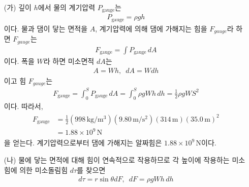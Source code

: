 \documentclass[floatfix,nofootinbib,superscriptaddress,fleqn]{revtex4-2}
\begin{document}
\begin{itemize}
  \item[(가)]
  깊이 $h$에서 물의 계기압력 $P_{\mathrm{gauge}}$는
  \begin{align}
    P_{\mathrm{gauge}} = \rho g h
  \end{align}
  이다.
  물과 댐이 닿는 면적을 $A$, 계기압력에 의해 댐에 가해지는 힘을 
  $F_{gauge}$라 하면 $F_{gauge}$는
  \begin{align}
    F_{\mathrm{gauge}} = \int P_{\mathrm{gauge}}\,dA
  \end{align}
  이다. 폭을 $W$라 하면 미소면적 $dA$는
  \begin{align}
    A = Wh,\,\,\, dA = Wdh
  \end{align}
  이고 힘 $F_{gauge}$는
  \begin{align}\label{eq:2-1}
    F_{\mathrm{gauge}} = \int^S_0 P_{\mathrm{gauge}}\,dA
    =\int^S_0 \rho g W h\,dh = \frac{1}{2}\rho g WS^2
  \end{align}
  이다. 따라서,
  \begin{align}
    \begin{split}
      F_{\mathrm{gauge}} &= \frac{1}{2}(998\,\mathrm{kg/m^3})
      (9.80\,\mathrm{m/s^2}) 
      (314\,\mathrm{m})(35.0\,\mathrm{m})^2  \\
      &= 1.88\times 10^9\,\mathrm{N}
    \end{split}
  \end{align}
  을 얻는다. 계기압력으로부터 댐에 가해지는 알짜힘은 
  $ 1.88\times 10^9\,\mathrm{N}$이다.
  \item[(나)] 물에 닿는 면적에 대해 힘이 연속적으로 작용하므로 
  각 높이에 작용하는 미소힘에 의한 미소돌림힘 $d\tau$를 찾으면
  \begin{align}
    d\tau = r\sin\theta dF,\,\,\,dF=\rho g Wh\,dh
  \end{align}

  \begin{figure}[htbp]
  \end{figure}


\end{itemize}
\end{document}
